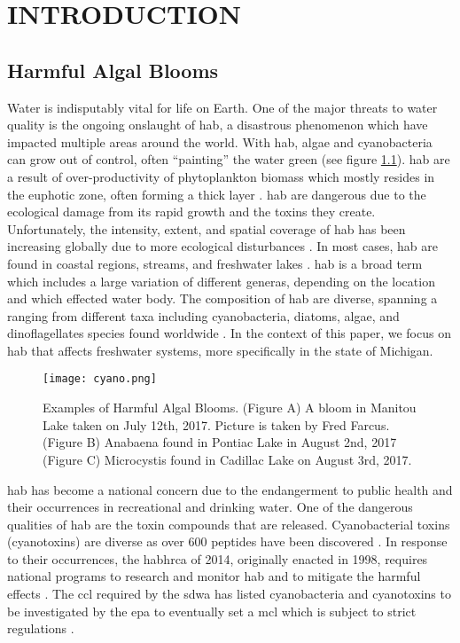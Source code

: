 \chapter{INTRODUCTION}
\section{Harmful Algal Blooms}

Water is indisputably vital for life on Earth. One of the major threats to water quality is the ongoing onslaught of \gls{hab}, a disastrous phenomenon which have impacted multiple areas around the world. With \gls{hab}, algae and cyanobacteria can grow out of control, often ``painting'' the water green (see figure \ref{fig:cyano}). \gls{hab} are a result of over-productivity of phytoplankton biomass which mostly resides in the euphotic zone, often forming a thick layer \cite{moore_richard_cyanobacterial_1993}.  \gls{hab} are dangerous due to the ecological damage from its rapid growth and the toxins they create. Unfortunately, the intensity, extent, and spatial coverage of \gls{hab} has been increasing globally due to more ecological disturbances \cite{codd_cyanobacterial_1999}. In most cases, \gls{hab} are found in coastal regions, streams, and freshwater lakes \cite{rastogi_cyanotoxin-microcystins:_2014}. \gls{hab} is a broad term which includes a large variation of different generas, depending on the location and which effected water body. The composition of \gls{hab} are diverse, spanning a ranging from  different taxa including cyanobacteria, diatoms, algae, and dinoflagellates species found worldwide \cite{dittmann_cyanobacterial_2012}. In the context of this paper, we focus on \gls{hab} that affects freshwater systems, more specifically in the state of Michigan.

\begin{figure}[!h]
	\texttt{[image: cyano.png]}
	\caption{
		Examples of Harmful Algal Blooms. (Figure A) A bloom in Manitou Lake taken on July 12th, 2017. Picture is taken by Fred Farcus. (Figure B) Anabaena found in Pontiac Lake in August 2nd, 2017  (Figure C) Microcystis found in Cadillac Lake on August 3rd, 2017.
	}
	\label{fig:cyano}
\end{figure}

\gls{hab} has become a national concern due to the endangerment to public health and their occurrences in recreational and drinking water. One of the dangerous qualities of \gls{hab} are the toxin compounds that are released. Cyanobacterial toxins (cyanotoxins) are diverse as over 600 peptides have been discovered \cite{welker_cyanobacterial_2006}. In response to their occurrences, the \gls{habhrca} of 2014, originally enacted in 1998, requires national programs to research and monitor \gls{hab} and to mitigate the harmful effects \cite{noauthor_harmful_2014}. The \gls{ccl} required by the \gls{sdwa} has listed cyanobacteria and cyanotoxins to be investigated by the \gls{epa} to eventually set a \gls{mcl} which is subject to strict regulations \cite{usepa_drinking_2016}. 

